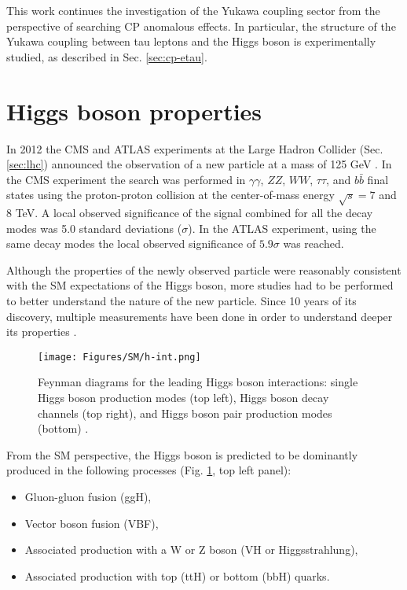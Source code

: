 This work continues the investigation of the Yukawa coupling sector from the perspective of searching CP anomalous effects. In particular, the structure of the Yukawa coupling between tau leptons and the Higgs boson is experimentally studied, as described in Sec. \ref{sec:cp-etau}.

\section{Higgs boson properties}\label{sec:higgs}

In 2012 the CMS and ATLAS experiments at the Large Hadron Collider (Sec. \ref{sec:lhc}) announced the observation of a new particle at a mass of 125 GeV \cite{ATLAS:2012yve, CMS:2012qbp}. In the CMS experiment the search was performed in $\gamma\gamma$, $ZZ$, $WW$, $\tau\tau$, and $b\bar{b}$ final states using the proton-proton collision at the center-of-mass energy $\sqrt{s} = 7$ and $8$ TeV. A local observed significance of the signal combined for all the decay modes was 5.0 standard deviations ($\sigma$). In the ATLAS experiment, using the same decay modes the local observed significance of $5.9\sigma$ was reached. 

Although the properties of the newly observed particle were reasonably consistent with the SM expectations of the Higgs boson, more studies had to be performed to better understand the nature of the new particle. Since 10 years of its discovery, multiple measurements have been done in order to understand deeper its properties \cite{CMS:2022dwd, ATLAS:2022vkf}.  

\begin{figure}[!h]
    \centering
    \texttt{[image: Figures/SM/h-int.png]}
    \caption{Feynman diagrams for the leading Higgs boson interactions: single Higgs boson production modes (top left), Higgs boson decay channels (top right), and Higgs boson pair production modes (bottom) \cite{Mulders:2019vhb}.}
    \label{fig:h-int}
\end{figure}

From the SM perspective, the Higgs boson is predicted to be dominantly produced in the following processes (Fig. \ref{fig:h-int}, top left panel): 
\begin{itemize}
    \item Gluon-gluon fusion (ggH),
    \item Vector boson fusion (VBF),
    \item Associated production with a W or Z boson (VH or Higgsstrahlung),
    \item Associated production with top (ttH) or bottom (bbH) quarks.
\end{itemize}

